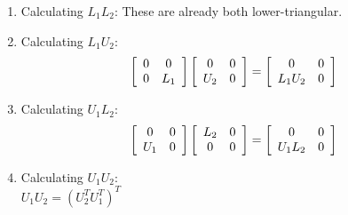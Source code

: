 \documentclass[10pt]{article}
\begin{document}
		\begin{enumerate}
		\item Calculating $L_1L_2$: These are already both lower-triangular.
		\item Calculating $L_1U_2$:
			\[
			\left[
				\begin{array}{c c}
					0 & 0\\
					0 & L_1
				\end{array}
			\right]
			\left[
				\begin{array}{c c}
					0 & 0\\
					U_2 & 0
				\end{array}
			\right]
			=
			\left[
				\begin{array}{c c}
					0 & 0\\
					L_1U_2 & 0
				\end{array}
			\right]
			\]
		
		\item Calculating $U_1L_2$:
			\[
			\left[
				\begin{array}{c c}
					0 & 0\\
					U_1 & 0
				\end{array}
			\right]
			\left[
				\begin{array}{c c}
					L_2 & 0\\
					0 & 0
				\end{array}
			\right]
			=
			\left[
				\begin{array}{c c}
					0 & 0\\
					U_1L_2 & 0
				\end{array}
			\right]
			\]
		\item Calculating $U_1U_2$:\\
		$U_1U_2 = {(U_2^T U_1^T)}^T$ 
		 
		\end{enumerate}
\end{document}

